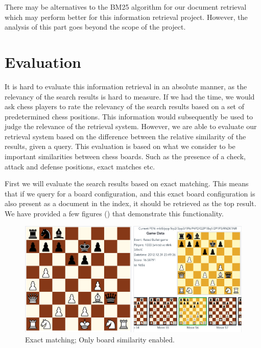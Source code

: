 \documentclass[11pt]{article}
\begin{document}

    There may be alternatives to the BM25 algorithm for our document retrieval which may perform better for this information retrieval project. However, the analysis of this part goes beyond the scope of the project.




    \section{Evaluation}

    It is hard to evaluate this information retrieval in an absolute manner, as the relevancy of the search results is hard to measure. If we had the time, we would ask chess players to rate the relevancy of the search results based on a set of predetermined chess positions. This information would subsequently be used to judge the relevance of the retrieval system. However, we are able to evaluate our retrieval system based on the difference between the relative similarity of the results, given a query. This evaluation is based on what we consider to be important similarities between chess boards. Such as the presence of a check, attack and defense positions, exact matches etc.

    First we will evaluate the search results based on exact matching. This means that if we query for a board configuration, and this exact board configuration is also present as a document in the index, it should be retrieved as the top result. We have provided a few figures () that demonstrate this functionality.

    \begin{figure}[H]
        \centering
        \includegraphics[width=14cm]{images/ExactMatch1-Bo}
        \caption{Exact matching; Only board similarity enabled.}
        \label{fig:ExactMatch1-Bo}
    \end{figure}
\end{document}
